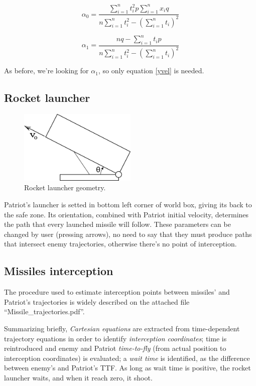 \documentclass[notitlepage,a4paper,11pt]{article} %
\begin{document}
			\begin{equation}
					\alpha_0 = \frac
					{\sum_{i=1}^n t_i^2 p \sum_{i=1}^n x_i q}{n \sum_{i=1}^n t_i^2 - (\sum_{i=1}^n t_i)^2}
			\end{equation}

			\begin{equation} \label{yvel}
					\alpha_1 = \frac
					{n q - \sum_{i=1}^n t_i p}{n \sum_{i=1}^n t_i^2 - (\sum_{i=1}^n t_i)^2}
			\end{equation}

			As before, we're looking for $\alpha_1$, so only equation \eqref{yvel} is needed.

	\subsection{Rocket launcher}

		\begin{figure}[htb]
		\centering \includegraphics[width=0.5\textwidth]{launcher}
			\caption{Rocket launcher geometry.}
		\end{figure}

		Patriot's launcher is setted in bottom left corner of world box, giving its back to the safe zone.
		Its orientation, combined with Patriot initial velocity, determines the path that every launched missile 
		 will follow.
		These parameters can be changed by user (pressing arrows), no need to say that they must produce paths that intersect enemy trajectories, otherwise there's no point of interception.

	\subsection{Missiles interception}

		The procedure used to estimate interception points between missiles' and Patriot's trajectories is widely described on the attached file \mbox{``Missile\_trajectories.pdf''}.

		Summarizing briefly, \emph{Cartesian equations} are extracted from time-dependent trajectory equations in order to identify \emph{interception coordinates}; time is reintroduced and enemy and Patriot \emph{time-to-fly} (from actual position to interception coordinates) is evaluated; a \emph{wait time} is identified, as the difference between enemy's and Patriot's TTF. As long as wait time is positive, the rocket launcher waits, and when it reach zero, it shoot.
\end{document}
